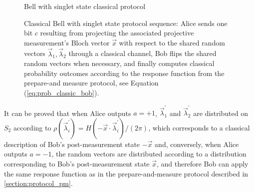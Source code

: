 \begin{figure}[tb]
\begin{center}
\begin{msc}[msc keyword=, instance width=3.6cm]{Bell with singlet state classical protocol}
\nextlevel[3]
\nextlevel[3]
\nextlevel[1]
\nextlevel[3]
\nextlevel[2]
\end{msc}
\end{center}
\caption{Classical Bell with singlet state protocol sequence: Alice sends one bit $c$ resulting from projecting the associated projective measurement's Bloch vector $\vec{x}$ with respect to the shared random vectors $\vec{\lambda}_1, \vec{\lambda}_2$ through a classical channel, Bob flips the shared random vectors when necessary, and finally computes classical probability outcomes according to the response function from the prepare-and measure protocol, see Equation (\ref{eq:prob_classic_bob}).}
\label{fig:msc_bell}
\end{figure}

It can be proved that when Alice outputs $a=+1$, $\vec{\lambda}^{\prime}_1$ and $\vec{\lambda}^{\prime}_2$ are distributed on $S_2$ according to $\rho(\vec{\lambda}^{\prime}_i) = H(-\vec{x} \cdot \vec{\lambda}^{\prime}_i)/(2\pi)$, which corresponds to a classical description of Bob's post-measurement state $-\vec{x}$ and, conversely, when Alice outputs $a=-1$, the random vectors are distributed according to a distribution corresponding to Bob's post-measurement state $\vec{x}$, and therefore Bob can apply the same response function as in the prepare-and-measure protocol described in \ref{section:protocol_pm}. 
